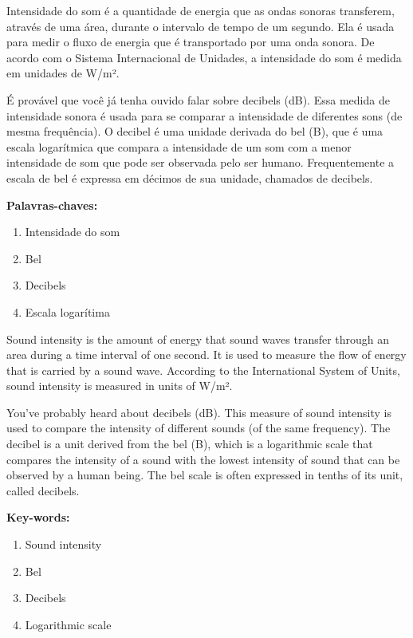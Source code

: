 \documentclass[
	article,		
	11pt,			
	oneside,		
	a4paper,			
	english,			
	brazil			
]{abntex2}
\begin{document}
\frenchspacing 

\maketitle

\begin{resumoumacoluna}
Intensidade do som é a quantidade de energia que as ondas sonoras transferem, através de uma área, durante o intervalo de tempo de um segundo. Ela é usada para medir o fluxo de energia que é transportado por uma onda sonora. De acordo com o Sistema Internacional de Unidades, a intensidade do som é medida em unidades de W/m².

É provável que você já tenha ouvido falar sobre decibels (dB). Essa medida de intensidade sonora é usada para se comparar a intensidade de diferentes sons (de mesma frequência). O decibel é uma unidade derivada do bel (B), que é uma escala logarítmica que compara a intensidade de um som com a menor intensidade de som que pode ser observada pelo ser humano. Frequentemente a escala de bel é expressa em décimos de sua unidade, chamados de decibels.\cite{HELERBROCKIntensidadeSomBrasilEscola}

\vspace{\onelineskip}
\noindent
\textbf{Palavras-chaves:}
\begin{enumerate}
    \item Intensidade do som 
    \item Bel
    \item Decibels
    \item Escala logarítima
\end{enumerate}
\end{resumoumacoluna}

\renewcommand{\resumoname}{Abstract}
\begin{resumoumacoluna}
Sound intensity is the amount of energy that sound waves transfer through an area during a time interval of one second. It is used to measure the flow of energy that is carried by a sound wave. According to the International System of Units, sound intensity is measured in units of W/m².

You've probably heard about decibels (dB). This measure of sound intensity is used to compare the intensity of different sounds (of the same frequency). The decibel is a unit derived from the bel (B), which is a logarithmic scale that compares the intensity of a sound with the lowest intensity of sound that can be observed by a human being. The bel scale is often expressed in tenths of its unit, called decibels.\cite{HELERBROCKIntensidadeSomBrasilEscola}

\vspace{\onelineskip}
\noindent
\textbf{Key-words:}
\begin{enumerate}
    \item Sound intensity 
    \item Bel
    \item Decibels
    \item Logarithmic scale
\end{enumerate}
\end{resumoumacoluna}
\end{document}
